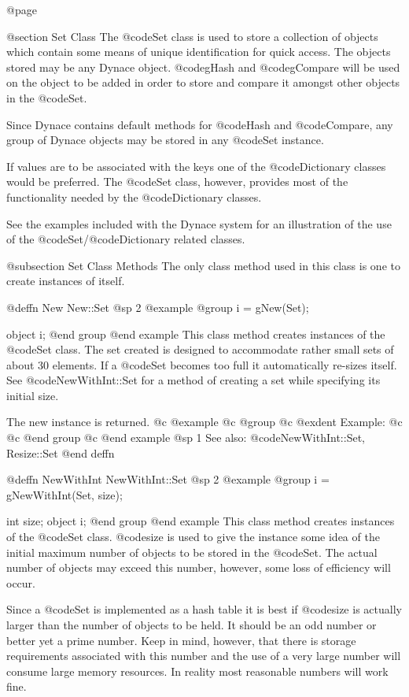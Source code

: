 @page

@section Set Class
The @code{Set} class is used to store a collection of objects which
contain some means of unique identification for quick access.  The
objects stored may be any Dynace object.  @code{gHash} and
@code{gCompare} will be used on the object to be added in order to store
and compare it amongst other objects in the @code{Set}.

Since Dynace contains default methods for @code{Hash} and @code{Compare},
any group of Dynace objects may be stored in any @code{Set} instance.

If values are to be associated with the keys one of the @code{Dictionary}
classes would be preferred.  The @code{Set} class, however, provides
most of the functionality needed by the @code{Dictionary} classes.

See the examples included with the Dynace system for an illustration of the
use of the @code{Set}/@code{Dictionary} related classes.



@subsection Set Class Methods
The only class method used in this class is one to create instances of itself.




@deffn {New} New::Set
@sp 2
@example
@group
i = gNew(Set);

object  i;
@end group
@end example
This class method creates instances of the @code{Set} class.  The set
created is designed to accommodate rather small sets of about 30
elements.  If a @code{Set} becomes too full it automatically re-sizes
itself.  See @code{NewWithInt::Set} for a method of creating a set
while specifying its initial size.

The new instance is returned.
@c @example
@c @group
@c @exdent Example:
@c 
@c @end group
@c @end example
@sp 1
See also:  @code{NewWithInt::Set, Resize::Set}
@end deffn







@deffn {NewWithInt} NewWithInt::Set
@sp 2
@example
@group
i = gNewWithInt(Set, size);

int     size;
object  i;
@end group
@end example
This class method creates instances of the @code{Set} class.
@code{size} is used to give the instance some idea of the initial maximum number
of objects to be stored in the @code{Set}.  The actual number of objects may
exceed this number, however, some loss of efficiency will occur.

Since a @code{Set} is implemented as a hash table it is best if @code{size}
is actually larger than the number of objects to be held.  It should
be an odd number or better yet a prime number.  Keep in mind, however,
that there is storage requirements associated with this number and
the use of a very large number will consume large memory resources.
In reality most reasonable numbers will work fine.

